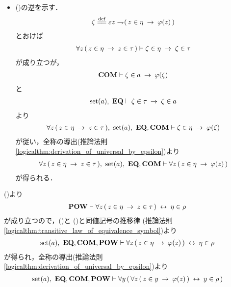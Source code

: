 \begin{sketch}
\begin{description}
\begin{itemize}
					\item ()の逆を示す．
						\begin{align}
							\zeta \defeq \varepsilon z \negation
							(\, z \in \eta \rarrow \varphi(z)\, )
						\end{align}
						とおけば
						\begin{align}
							\forall z\, (\, z \in \eta \hspace{0.25em}\rightarrow\hspace{0.25em} z \in \tau\, )
							\vdash \zeta \in \eta \hspace{0.25em}\rightarrow\hspace{0.25em} \zeta \in \tau
						\end{align}
						が成り立つが，
						\begin{align}
							\mbox{\bf COM} \vdash \zeta \in a \hspace{0.25em}\rightarrow\hspace{0.25em} \varphi(\zeta)
						\end{align}
						と
						\begin{align}
							\operatorname*{set} (a),\ \mbox{{\bf EQ}} \vdash \zeta \in \tau \hspace{0.25em}\rightarrow\hspace{0.25em} \zeta \in a
						\end{align}
						より
						\begin{align}
							\forall z\, (\, z \in \eta \rarrow z \in \tau\, ),\ 
							\set{a},\ \EQAX,\COMAX
							\vdash \zeta \in \eta \rarrow \varphi(\zeta)
						\end{align}
						が従い，全称の導出(推論法則\ref{logicalthm:derivation_of_universal_by_epsilon})より
						\begin{align}
							\forall z\, (\, z \in \eta \rarrow z \in \tau\, ),\ 
							\set{a},\ \EQAX,\COMAX \vdash 
							\forall z\, (\, z \in \eta \rarrow \varphi(z)\, )
						\end{align}
						が得られる．
				\end{itemize}
				()より
				\begin{align}
					\mbox{{\bf POW}} \vdash \forall z\, (\, z \in \eta \hspace{0.25em}\rightarrow\hspace{0.25em} z \in \tau\, )
					\hspace{0.25em}\leftrightarrow\hspace{0.25em} \eta \in \rho
					\label{fom:power_of_a_set_is_a_set_5}
				\end{align}
				が成り立つので，()と
				()と同値記号の推移律
				(推論法則\ref{logicalthm:transitive_law_of_equivalence_symbol})より
				\begin{align}
					\operatorname*{set} (a),\ \mbox{{\bf EQ}},\mbox{\bf COM},\mbox{{\bf POW}} \vdash 
					\forall z\, (\, z \in \eta \hspace{0.25em}\rightarrow\hspace{0.25em} \varphi(z)\, ) \hspace{0.25em}\leftrightarrow\hspace{0.25em} \eta \in \rho
				\end{align}
				が得られ，全称の導出(推論法則\ref{logicalthm:derivation_of_universal_by_epsilon})より
				\begin{align}
					\set{a},\ \EQAX,\COMAX,\POWAX \vdash 
					\forall y\, (\, \forall z\, (\, z \in y \rarrow \varphi(z)\, ) \lrarrow y \in \rho\, )

\end{align}
\end{description}
\end{sketch}
